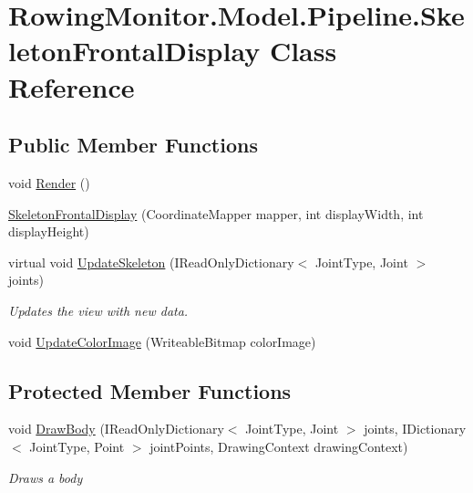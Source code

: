 \hypertarget{class_rowing_monitor_1_1_model_1_1_pipeline_1_1_skeleton_frontal_display}{}\section{Rowing\+Monitor.\+Model.\+Pipeline.\+Skeleton\+Frontal\+Display Class Reference}
\label{class_rowing_monitor_1_1_model_1_1_pipeline_1_1_skeleton_frontal_display}
\subsection*{Public Member Functions}
\begin{DoxyCompactItemize}
\item 
void \hyperlink{class_rowing_monitor_1_1_model_1_1_pipeline_1_1_skeleton_frontal_display_ae55122ec00fa8ea4a95037c3cb4d8580}{Render} ()
\item 
\hyperlink{class_rowing_monitor_1_1_model_1_1_pipeline_1_1_skeleton_frontal_display_afd21a93370aa49b931f002d9e035426a}{Skeleton\+Frontal\+Display} (Coordinate\+Mapper mapper, int display\+Width, int display\+Height)
\item 
virtual void \hyperlink{class_rowing_monitor_1_1_model_1_1_pipeline_1_1_skeleton_frontal_display_a698babc7b0ee287fd25de6e784b242ab}{Update\+Skeleton} (I\+Read\+Only\+Dictionary$<$ Joint\+Type, Joint $>$ joints)
\begin{DoxyCompactList}\small\item\em Updates the view with new data. \end{DoxyCompactList}\item 
void \hyperlink{class_rowing_monitor_1_1_model_1_1_pipeline_1_1_skeleton_frontal_display_af4c354d73bb82b2bb35a8eefe1dd3851}{Update\+Color\+Image} (Writeable\+Bitmap color\+Image)
\end{DoxyCompactItemize}
\subsection*{Protected Member Functions}
\begin{DoxyCompactItemize}
\item 
void \hyperlink{class_rowing_monitor_1_1_model_1_1_pipeline_1_1_skeleton_frontal_display_a4f24762b003e94837e955d31f81c0499}{Draw\+Body} (I\+Read\+Only\+Dictionary$<$ Joint\+Type, Joint $>$ joints, I\+Dictionary$<$ Joint\+Type, Point $>$ joint\+Points, Drawing\+Context drawing\+Context)
\begin{DoxyCompactList}\small\item\em Draws a body \end{DoxyCompactList}\end{DoxyCompactItemize}
